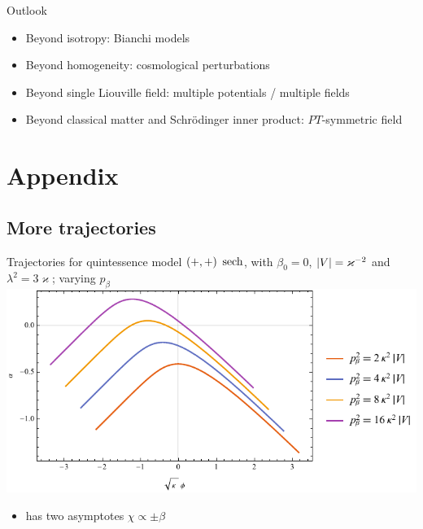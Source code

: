 \documentclass[8pt]{beamer}
\begin{document}
\begin{frame}%
{Outlook}%
\begin{itemize}
\item Beyond isotropy: Bianchi models

\item Beyond homogeneity: cosmological perturbations 

\item Beyond single Liouville field: multiple potentials / multiple 
fields

\item Beyond classical matter and Schrödinger inner product: $PT$-symmetric 
field 

\end{itemize}
\end{frame}


\section*{Appendix}

\subsection*{More trajectories}

\begin{frame}%
{Trajectories for quintessence model ${\left(+,+\right)}$}%
{$\operatorname{sech}$, with $\beta_0 = 0$, ${\left|V\right|} = \varkappa^{-2}$ and
$\lambda^2 = 3\varkappa$; varying $p_\beta$}
\includegraphics[width=\textwidth]{../plots.nb/sech_pbet.pdf}
\begin{itemize}
	\item has two asymptotes $\chi \propto \pm \beta$
\end{itemize}
\end{frame}
\end{document}
